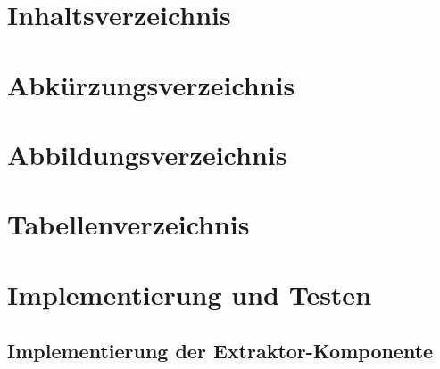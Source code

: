 \documentclass[10pt]{article}
\begin{document}
\newpage

\section{Inhaltsverzeichnis}

\renewcommand{\contentsname}{}
\tableofcontents
\newpage
\section{Abkürzungsverzeichnis}
\newpage
\section{Abbildungsverzeichnis}
\renewcommand{\listfigurename}{}
\listoffigures
\newpage
\section{Tabellenverzeichnis}
\renewcommand{\listtablename}{}
\listoftables{}
\newpage
\setcounter{section}{0}
\renewcommand\thesection{\arabic{section}}




\section{Implementierung und Testen}
\subsection{Implementierung der Extraktor-Komponente}
\end{document}
